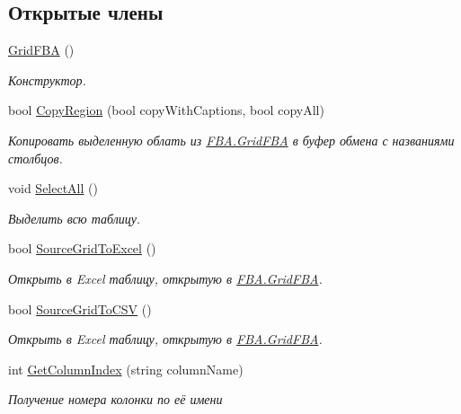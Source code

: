 \subsection*{Открытые члены}
\begin{DoxyCompactItemize}
\item 
\mbox{\hyperlink{class_f_b_a_1_1_grid_f_b_a_a04c3a780023d3791a39b0bc1fa37437f}{Grid\+F\+BA}} ()
\begin{DoxyCompactList}\small\item\em Конструктор. \end{DoxyCompactList}\item 
bool \mbox{\hyperlink{class_f_b_a_1_1_grid_f_b_a_aa1ff5c21ce47cf95da542f611070d40d}{Copy\+Region}} (bool copy\+With\+Captions, bool copy\+All)
\begin{DoxyCompactList}\small\item\em Копировать выделенную облать из \mbox{\hyperlink{class_f_b_a_1_1_grid_f_b_a}{F\+B\+A.\+Grid\+F\+BA}} в буфер обмена с названиями столбцов. \end{DoxyCompactList}\item 
void \mbox{\hyperlink{class_f_b_a_1_1_grid_f_b_a_acb10ddc9ad434e7966a2eb2fbfc594b9}{Select\+All}} ()
\begin{DoxyCompactList}\small\item\em Выделить всю таблицу. \end{DoxyCompactList}\item 
bool \mbox{\hyperlink{class_f_b_a_1_1_grid_f_b_a_a46bcb6ce2e842cd06d2798b3b641b078}{Source\+Grid\+To\+Excel}} ()
\begin{DoxyCompactList}\small\item\em Открыть в Excel таблицу, открытую в \mbox{\hyperlink{class_f_b_a_1_1_grid_f_b_a}{F\+B\+A.\+Grid\+F\+BA}}. \end{DoxyCompactList}\item 
bool \mbox{\hyperlink{class_f_b_a_1_1_grid_f_b_a_a5ca323bec7fef57d7182cdce6eecee7a}{Source\+Grid\+To\+C\+SV}} ()
\begin{DoxyCompactList}\small\item\em Открыть в Excel таблицу, открытую в \mbox{\hyperlink{class_f_b_a_1_1_grid_f_b_a}{F\+B\+A.\+Grid\+F\+BA}}. \end{DoxyCompactList}\item 
int \mbox{\hyperlink{class_f_b_a_1_1_grid_f_b_a_a7cb1d7d7cee4041f258cfc38bfa4d52e}{Get\+Column\+Index}} (string column\+Name)
\begin{DoxyCompactList}\small\item\em Получение номера колонки по её имени \end{DoxyCompactList}\item 

\end{DoxyCompactItemize}
